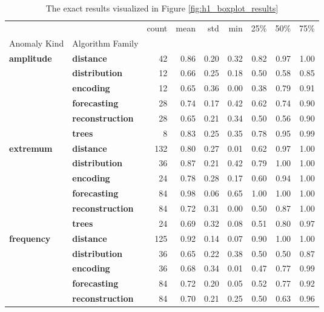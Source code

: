 \begin{table}
\caption{The exact results visualized in Figure \ref{fig:h1_boxplot_results}}
\label{tab:h1_boxplot_results}
\begin{tabular}{llrrrrrrr}
\toprule
 &  & count & mean & std & min & 25\% & 50\% & 75\% \\
Anomaly Kind & Algorithm Family &  &  &  &  &  &  &  \\
\midrule
\multirow[t]{6}{*}{\textbf{amplitude}} & \textbf{distance} & 42 & 0.86 & 0.20 & 0.32 & 0.82 & 0.97 & 1.00 \\
\textbf{} & \textbf{distribution} & 12 & 0.66 & 0.25 & 0.18 & 0.50 & 0.58 & 0.85 \\
\textbf{} & \textbf{encoding} & 12 & 0.65 & 0.36 & 0.00 & 0.38 & 0.79 & 0.91 \\
\textbf{} & \textbf{forecasting} & 28 & 0.74 & 0.17 & 0.42 & 0.62 & 0.74 & 0.90 \\
\textbf{} & \textbf{reconstruction} & 28 & 0.65 & 0.21 & 0.34 & 0.50 & 0.56 & 0.90 \\
\textbf{} & \textbf{trees} & 8 & 0.83 & 0.25 & 0.35 & 0.78 & 0.95 & 0.99 \\
\cline{1-9}
\multirow[t]{6}{*}{\textbf{extremum}} & \textbf{distance} & 132 & 0.80 & 0.27 & 0.01 & 0.62 & 0.97 & 1.00 \\
\textbf{} & \textbf{distribution} & 36 & 0.87 & 0.21 & 0.42 & 0.79 & 1.00 & 1.00 \\
\textbf{} & \textbf{encoding} & 24 & 0.78 & 0.28 & 0.17 & 0.60 & 0.94 & 1.00 \\
\textbf{} & \textbf{forecasting} & 84 & 0.98 & 0.06 & 0.65 & 1.00 & 1.00 & 1.00 \\
\textbf{} & \textbf{reconstruction} & 84 & 0.72 & 0.31 & 0.00 & 0.50 & 0.87 & 1.00 \\
\textbf{} & \textbf{trees} & 24 & 0.69 & 0.32 & 0.08 & 0.51 & 0.80 & 0.97 \\
\cline{1-9}
\multirow[t]{6}{*}{\textbf{frequency}} & \textbf{distance} & 125 & 0.92 & 0.14 & 0.07 & 0.90 & 1.00 & 1.00 \\
\textbf{} & \textbf{distribution} & 36 & 0.65 & 0.22 & 0.38 & 0.50 & 0.50 & 0.87 \\
\textbf{} & \textbf{encoding} & 36 & 0.68 & 0.34 & 0.01 & 0.47 & 0.77 & 0.99 \\
\textbf{} & \textbf{forecasting} & 84 & 0.72 & 0.20 & 0.05 & 0.52 & 0.77 & 0.92 \\
\textbf{} & \textbf{reconstruction} & 84 & 0.70 & 0.21 & 0.25 & 0.50 & 0.63 & 0.96 \\

\end{tabular}
\end{table}
